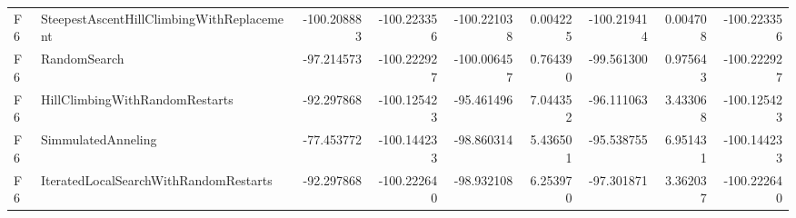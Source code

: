 \begin{tabular}{llrrrrrrr}
F6 & SteepestAscentHillClimbingWithReplacement & -100.208883 & -100.223356 & -100.221038 & 0.004225 & -100.219414 & 0.004708 & -100.223356 \\
F6 & RandomSearch & -97.214573 & -100.222927 & -100.006457 & 0.764390 & -99.561300 & 0.975643 & -100.222927 \\
F6 & HillClimbingWithRandomRestarts & -92.297868 & -100.125423 & -95.461496 & 7.044352 & -96.111063 & 3.433068 & -100.125423 \\
F6 & SimmulatedAnneling & -77.453772 & -100.144233 & -98.860314 & 5.436501 & -95.538755 & 6.951431 & -100.144233 \\
F6 & IteratedLocalSearchWithRandomRestarts & -92.297868 & -100.222640 & -98.932108 & 6.253970 & -97.301871 & 3.362037 & -100.222640 \\
\bottomrule
\end{tabular}
